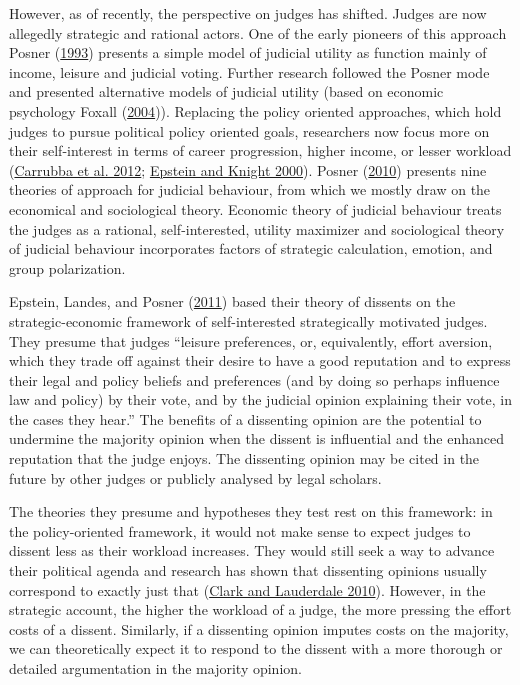 \documentclass[
  11pt,
]{article}
\begin{document}
However, as of recently, the perspective on judges has shifted. Judges
are now allegedly strategic and rational actors. One of the early
pioneers of this approach Posner
(\protect\hyperlink{ref-posnerWhatJudgesJustices1993}{1993}) presents a
simple model of judicial utility as function mainly of income, leisure
and judicial voting. Further research followed the Posner mode and
presented alternative models of judicial utility (based on economic
psychology Foxall
(\protect\hyperlink{ref-foxallWhatJudgesMaximize2004}{2004})). Replacing
the policy oriented approaches, which hold judges to pursue political
policy oriented goals, researchers now focus more on their self-interest
in terms of career progression, higher income, or lesser workload
(\protect\hyperlink{ref-carrubbaWhoControlsContent2012}{Carrubba et al.
2012};
\protect\hyperlink{ref-epsteinStrategicRevolutionJudicial2000}{Epstein
and Knight 2000}). Posner
(\protect\hyperlink{ref-posnerHowJudgesThink2010}{2010}) presents nine
theories of approach for judicial behaviour, from which we mostly draw
on the economical and sociological theory. Economic theory of judicial
behaviour treats the judges as a rational, self-interested, utility
maximizer and sociological theory of judicial behaviour incorporates
factors of strategic calculation, emotion, and group polarization.

Epstein, Landes, and Posner
(\protect\hyperlink{ref-epsteinWhyWhenJudges2011}{2011}) based their
theory of dissents on the strategic-economic framework of
self-interested strategically motivated judges. They presume that judges
``leisure preferences, or, equivalently, effort aversion, which they
trade off against their desire to have a good reputation and to express
their legal and policy beliefs and preferences (and by doing so perhaps
influence law and policy) by their vote, and by the judicial opinion
explaining their vote, in the cases they hear.'' The benefits of a
dissenting opinion are the potential to undermine the majority opinion
when the dissent is influential and the enhanced reputation that the
judge enjoys. The dissenting opinion may be cited in the future by other
judges or publicly analysed by legal scholars.

The theories they presume and hypotheses they test rest on this
framework: in the policy-oriented framework, it would not make sense to
expect judges to dissent less as their workload increases. They would
still seek a way to advance their political agenda and research has
shown that dissenting opinions usually correspond to exactly just that
(\protect\hyperlink{ref-clarkLocatingSupremeCourt2010}{Clark and
Lauderdale 2010}). However, in the strategic account, the higher the
workload of a judge, the more pressing the effort costs of a dissent.
Similarly, if a dissenting opinion imputes costs on the majority, we can
theoretically expect it to respond to the dissent with a more thorough
or detailed argumentation in the majority opinion.
\end{document}

